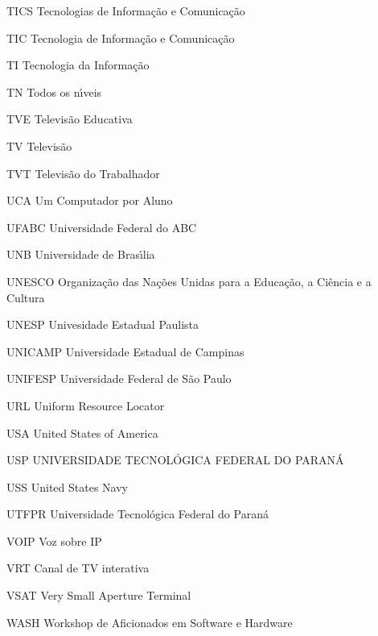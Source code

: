 \begin{siglas}
\item[TICS] Tecnologias de Informa\c{c}\~ao e Comunica\c{c}\~ao
\item[TIC] Tecnologia de Informa\c{c}\~ao e Comunica\c{c}\~ao
\item[TI] Tecnologia da Informa\c{c}\~ao
\item[TN] Todos os n\'{\i}veis
\item[TVE] Televis\~ao Educativa
\item[TV] Televis\~ao
\item[TVT] Televis\~ao do Trabalhador
\item[UCA] Um Computador por Aluno
\item[UFABC] Universidade Federal do ABC 
\item[UNB] Universidade de Bras\'{\i}lia
\item[UNESCO] Organiza\c{c}\~ao das Na\c{c}\~oes Unidas para a Educa\c{c}\~ao, a Ci\^encia e a Cultura  
\item[UNESP] Univesidade Estadual Paulista
\item[UNICAMP] Universidade Estadual de Campinas
\item[UNIFESP] Universidade Federal de S\~ao Paulo
\item[URL] Uniform Resource Locator
\item[USA] United States of America
\item[USP] UNIVERSIDADE TECNOL\'OGICA FEDERAL DO PARAN\'A
\item[USS] United States Navy
\item[UTFPR] Universidade Tecnol\'ogica Federal do Paran\'a
\item[VOIP] Voz sobre IP
\item[VRT] Canal de TV interativa
\item[VSAT] Very Small Aperture Terminal
\item[WASH] Workshop de Aficionados em Software e Hardware

\end{siglas}
